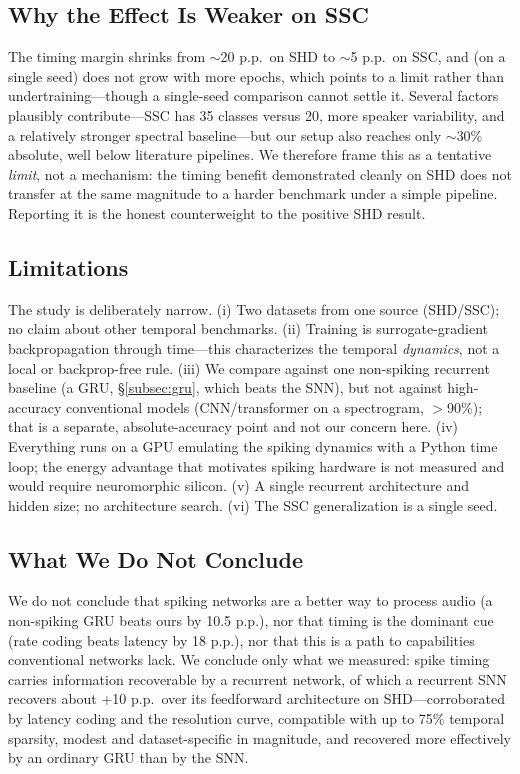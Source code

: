 \documentclass[11pt]{article}
\begin{document}
\subsection{Why the Effect Is Weaker on SSC}
The timing margin shrinks from $\sim$20 p.p.\ on SHD to $\sim$5 p.p.\ on SSC, and (on a single seed) does not grow with more epochs, which points to a limit rather than undertraining---though a single-seed comparison cannot settle it. Several factors plausibly contribute---SSC has 35 classes versus 20, more speaker variability, and a relatively stronger spectral baseline---but our setup also reaches only $\sim$30\% absolute, well below literature pipelines. We therefore frame this as a tentative \emph{limit}, not a mechanism: the timing benefit demonstrated cleanly on SHD does not transfer at the same magnitude to a harder benchmark under a simple pipeline. Reporting it is the honest counterweight to the positive SHD result.

\subsection{Limitations}
The study is deliberately narrow. (i) Two datasets from one source (SHD/SSC); no claim about other temporal benchmarks. (ii) Training is surrogate-gradient backpropagation through time---this characterizes the temporal \emph{dynamics}, not a local or backprop-free rule. (iii) We compare against one non-spiking recurrent baseline (a GRU, \S\ref{subsec:gru}, which beats the SNN), but not against high-accuracy conventional models (CNN/transformer on a spectrogram, $>$90\%); that is a separate, absolute-accuracy point and not our concern here. (iv) Everything runs on a GPU emulating the spiking dynamics with a Python time loop; the energy advantage that motivates spiking hardware is not measured and would require neuromorphic silicon. (v) A single recurrent architecture and hidden size; no architecture search. (vi) The SSC generalization is a single seed.

\subsection{What We Do Not Conclude}
We do not conclude that spiking networks are a better way to process audio (a non-spiking GRU beats ours by 10.5 p.p.), nor that timing is the dominant cue (rate coding beats latency by 18 p.p.), nor that this is a path to capabilities conventional networks lack. We conclude only what we measured: spike timing carries information recoverable by a recurrent network, of which a recurrent SNN recovers about +10 p.p.\ over its feedforward architecture on SHD---corroborated by latency coding and the resolution curve, compatible with up to 75\% temporal sparsity, modest and dataset-specific in magnitude, and recovered more effectively by an ordinary GRU than by the SNN.
\end{document}
